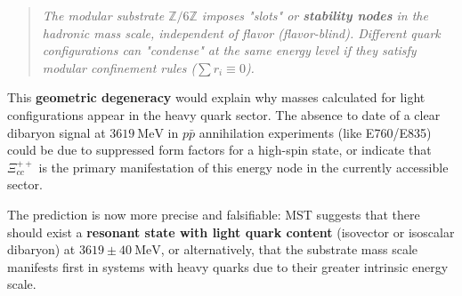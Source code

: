 \documentclass[11pt, a4paper]{article}
\theoremstyle{plain}
\theoremstyle{definition}
\begin{document}
\begin{quote}
\emph{The modular substrate $\mathbb{Z}/6\mathbb{Z}$ imposes "slots" or \textbf{stability nodes} in the hadronic mass scale, independent of flavor (\textit{flavor-blind}). Different quark configurations can "condense" at the same energy level if they satisfy modular confinement rules ($\sum r_i \equiv 0$).}
\end{quote}

This \textbf{geometric degeneracy} would explain why masses calculated for light configurations appear in the heavy quark sector. The absence to date of a clear dibaryon signal at $3619\ \si{\mega\electronvolt}$ in $p\bar{p}$ annihilation experiments (like E760/E835) could be due to suppressed form factors for a high-spin state, or indicate that $\Xi_{cc}^{++}$ is the primary manifestation of this energy node in the currently accessible sector.

The prediction is now more precise and falsifiable: MST suggests that there should exist a \textbf{resonant state with light quark content} (isovector or isoscalar dibaryon) at $3619 \pm 40\ \si{\mega\electronvolt}$, or alternatively, that the substrate mass scale manifests first in systems with heavy quarks due to their greater intrinsic energy scale.

\begin{table}[H]
\centering
\caption{Experimental validation of modular confinement (2024-2025)}
\label{tab:hadronic_validation}
\end{table}
\end{document}

